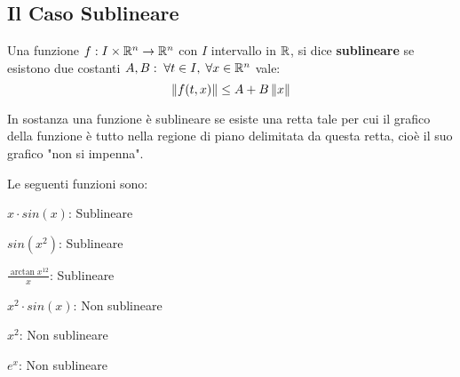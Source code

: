 \cbend

\subsection{Il Caso Sublineare}
\begin{definition}
	\label{def:sublineare}
	Una funzione $f:I\times\mathbb{R}^n\to \mathbb{R}^n$ con $I$ intervallo in $\mathbb{R}$, si dice \textbf{sublineare} se esistono due costanti $A, B:\; \forall t \in I,\;\forall x \in \mathbb{R}^n$ vale:
	\[\left\|f(t,x)\right\|\leq A + B \left\|x\right\|\]
	\vspace*{-\baselineskip}
	\begin{note}
		In sostanza una funzione è sublineare se esiste una retta tale per cui il grafico della funzione è tutto nella regione di piano delimitata da questa retta, cioè il suo grafico "non si impenna".
		\begin{center}
		\end{center}
	\end{note}
\end{definition}
\begin{example}
	Le seguenti funzioni sono:
	\begin{itemize}
		\begin{minipage}{0.49\linewidth}
			\item $x\cdot sin(x)$: Sublineare
			\item $sin(x^2)$: Sublineare
			\item $\frac{\arctan x^{12}}{x}$: Sublineare
		\end{minipage}
		\begin{minipage}{0.49\linewidth}
			\item $x^2\cdot sin(x)$: Non sublineare
			\item $x^2$: Non sublineare
			\item $e^x$: Non sublineare
		\end{minipage}
	\end{itemize}
\end{example}

